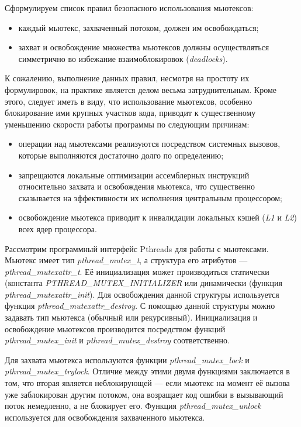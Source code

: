 Сформулируем список правил безопасного использования мьютексов:
\begin{itemize}
\item каждый мьютекс, захваченный потоком, должен им освобождаться;
\item захват и освобождение множества мьютексов должны осуществляться симметрично
  во избежание взаимоблокировок (\textit{deadlocks}).
\end{itemize}

К сожалению, выполнение данных правил, несмотря на простоту их формулировок,
на практике является делом весьма затруднительным.
Кроме этого, следует иметь в виду, что использование мьютексов,
особенно блокирование ими крупных участков кода, приводит к существенному
уменьшению скорости работы программы по следующим причинам:
\begin{itemize}
\item операции над мьютексами реализуются посредством системных вызовов,
  которые выполняются достаточно долго по определению;
\item запрещаются локальные оптимизации ассемблерных инструкций
  относительно захвата и освобождения мьютекса,
  что существенно сказывается на эффективности их исполнения
  центральным процессором;
\item освобождение мьютекса приводит к инвалидации локальных кэшей
  (\textit{L1} и \textit{L2}) всех ядер процессора.
\end{itemize}

Рассмотрим программный интерфейс Pthreads для работы с мьютексами.
Мьютекс имеет тип \textit{pthread\_mutex\_t}, а структура его атрибутов ---
\textit{pthread\_mutexattr\_t}.
Её инициализация может производиться статически
(константа \textit{PTHREAD\_MUTEX\_INITIALIZER} или динамически
(функция \textit{pthread\_mutexattr\_init}).
Для освобождения данной структуры используется функция
\textit{pthread\_mutexattr\_destroy}.
С помощью данной структуры можно задавать тип мьютекса (обычный или рекурсивный).
Инициализация и освобождение мьютексов производится посредством
функций \textit{pthread\_mutex\_init} и \textit{pthread\_mutex\_destroy}
соответственно.

Для захвата мьютекса используются функции \textit{pthread\_mutex\_lock}
и \textit{pthread\_mutex\_trylock}. Отличие между этими двумя функциями
заключается в том, что вторая является неблокирующей --- если мьютекс на момент
её вызова уже заблокирован другим потоком, она возращает код ошибки в
вызывающий поток немедленно, а не блокирует его.
Функция \textit{pthread\_mutex\_unlock} используется для освобождения
захваченного мьютекса.

